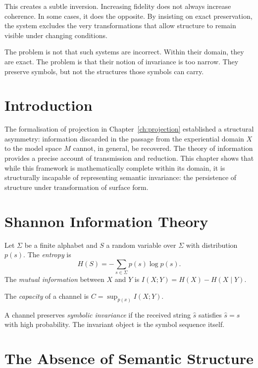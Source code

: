 \documentclass[11pt,openany]{book}
\begin{document}
This creates a subtle inversion. Increasing fidelity does not always increase coherence. In some cases, it does the opposite. By insisting on exact preservation, the system excludes the very transformations that allow structure to remain visible under changing conditions.

The problem is not that such systems are incorrect. Within their domain, they are exact. The problem is that their notion of invariance is too narrow. They preserve symbols, but not the structures those symbols can carry.

\section{Introduction}
\label{sec:introduction-information}

The formalisation of projection in Chapter~\ref{ch:projection}
established a structural asymmetry: information discarded in
the passage from the experiential domain $X$ to the model
space $M$ cannot, in general, be recovered. The theory of
information provides a precise account of transmission and
reduction. This chapter shows that while this framework is
mathematically complete within its domain, it is
structurally incapable of representing semantic invariance:
the persistence of structure under transformation of surface
form.

\section{Shannon Information Theory}
\label{sec:shannon}

Let $\Sigma$ be a finite alphabet and $S$ a random variable
over $\Sigma$ with distribution $p(s)$. The
\emph{entropy} is
\[
  H(S) = -\sum_{s \in \Sigma} p(s) \log p(s).
\]
The \emph{mutual information} between $X$ and $Y$ is
$I(X;Y) = H(X) - H(X \mid Y)$.

\begin{definition}
The \emph{capacity} of a channel is
$C = \sup_{p(x)} I(X;Y)$.
\end{definition}

\begin{definition}
A channel preserves \emph{symbolic invariance} if the
received string $\hat{s}$ satisfies $\hat{s} = s$ with high
probability. The invariant object is the symbol sequence
itself.
\end{definition}

\section{The Absence of Semantic Structure}
\label{sec:semantics}
\end{document}
